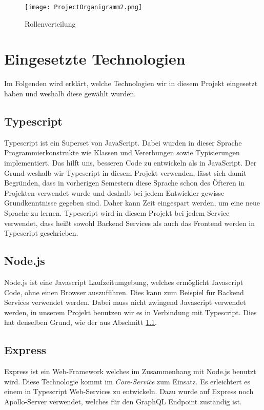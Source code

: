     \begin{figure}[!hbt]
        \texttt{[image: ProjectOrganigramm2.png]}
        \caption{Rollenverteilung}
        \label{fig:Rollenverteilung}
    \end{figure}
    
\section{Eingesetzte Technologien}
Im Folgenden wird erklärt, welche Technologien wir in diesem Projekt eingesetzt haben und weshalb diese gewählt wurden.

\subsection{Typescript} \label{sub:Typescript}
    Typescript ist ein Superset von JavaScript. Dabei wurden in dieser Sprache Programmierkonstrukte wie Klassen und Vererbungen sowie Typisierungen implementiert. Das hilft uns, besseren Code zu entwickeln als in JavaScript.
    Der Grund weshalb wir Typescript in diesem Projekt verwenden, lässt sich damit Begründen, dass in vorherigen Semestern diese Sprache schon des Öfteren in Projekten verwendet wurde und deshalb bei jedem Entwickler gewisse Grundkenntnisse
    gegeben sind. Daher kann Zeit eingespart werden, um eine neue Sprache zu lernen. Typescript wird in diesem Projekt bei jedem Service verwendet, dass heißt sowohl Backend Services als auch das Frontend werden in Typescript geschrieben.
\subsection{Node.js}
    Node.js ist eine Javascript Laufzeitumgebung, welches ermöglicht Javascript Code, ohne einen Browser auszuführen. Dies kann zum Beispiel für Backend Services verwendet werden. Dabei muss nicht zwingend Javascript verwendet werden,
    in unserem Projekt benutzen wir es in Verbindung mit Typescript. Dies hat denselben Grund, wie der aus Abschnitt \ref{sub:Typescript}.
\subsection{Express}
    Express ist ein Web-Framework welches im Zusammenhang mit Node.js benutzt wird. Diese Technologie kommt im \textit{Core-Service} zum Einsatz. Es erleichtert es einem in Typescript Web-Services zu entwickeln.
    Dazu wurde auf Express noch Apollo-Server verwendet, welches für den GraphQL Endpoint zuständig ist.
